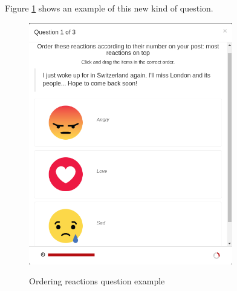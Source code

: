 Figure \ref{fig:reactOrder} shows an example of this new kind of question.
\begin{figure}[!h]
\center
{\includegraphics[width=3.5in]{images/order_reactions.png}}
\caption{Ordering reactions question example}
\label{fig:reactOrder}
\end{figure}
